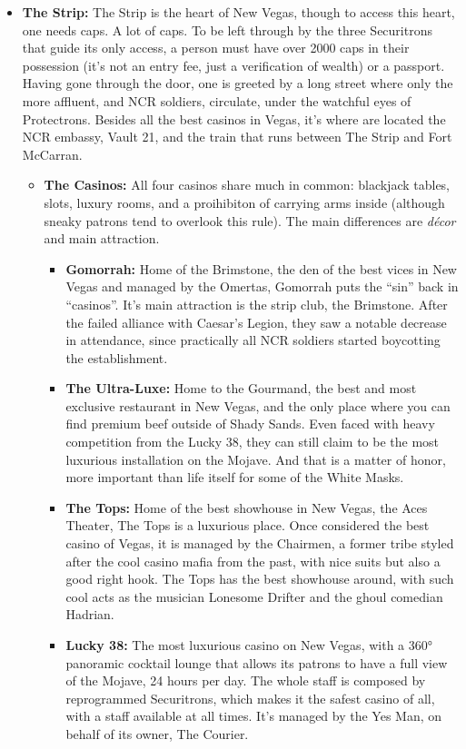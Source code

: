 \documentclass[11pt]{article} %
\begin{document}
\begin{itemize}
	\item \textbf{The Strip:} The Strip is the heart of New Vegas, though to access this heart, one needs caps. A lot of caps. To be left through by the three Securitrons that guide its only access, a person must have over 2000 caps in their possession (it's not an entry fee, just a verification of wealth) or a passport. Having gone through the door, one is greeted by a long street where only the more affluent, and NCR soldiers, circulate, under the watchful eyes of Protectrons. Besides all the best casinos in Vegas, it's where are located the NCR embassy, Vault 21, and the train that runs between The Strip and Fort McCarran. 
	\begin{itemize}
		\item \textbf{The Casinos:} All four casinos share much in common: blackjack tables, slots, luxury rooms, and a proihibiton of carrying arms inside (although sneaky patrons tend to overlook this rule). The main differences are \textit{décor} and main attraction. 
	\begin{itemize}
		\item \textbf{Gomorrah:} Home of the Brimstone, the den of the best vices in New Vegas and managed by the Omertas, Gomorrah puts the ``sin'' back in ``casinos''. It's main attraction is the strip club, the Brimstone. After the failed alliance with Caesar's Legion, they saw a notable decrease in attendance, since practically all NCR soldiers started boycotting the establishment.
		\item \textbf{The Ultra-Luxe:} Home to the Gourmand, the best and most exclusive restaurant in New Vegas, and the only place where you can find premium beef outside of Shady Sands. Even faced with heavy competition from the Lucky 38, they can still claim to be the most luxurious installation on the Mojave. And that is a matter of honor, more important than life itself for some of the White Masks.
		\item \textbf{The Tops:} Home of the best showhouse in New Vegas, the Aces Theater, The Tops is a luxurious place. Once considered the best casino of Vegas, it is managed by the Chairmen, a former tribe styled after the cool casino mafia from the past, with nice suits but also a good right hook. The Tops has the best showhouse around, with such cool acts as the musician Lonesome Drifter and the ghoul comedian Hadrian.
		\item \textbf{Lucky 38:} The most luxurious casino on New Vegas, with a 360° panoramic cocktail lounge that allows its patrons to have a full view of the Mojave, 24 hours per day. The whole staff is composed by reprogrammed Securitrons, which makes it the safest casino of all, with a staff available at all times. It's managed by the Yes Man, on behalf of its owner, The Courier.
	\end{itemize}
\end{itemize}


\end{itemize}
\end{document}
